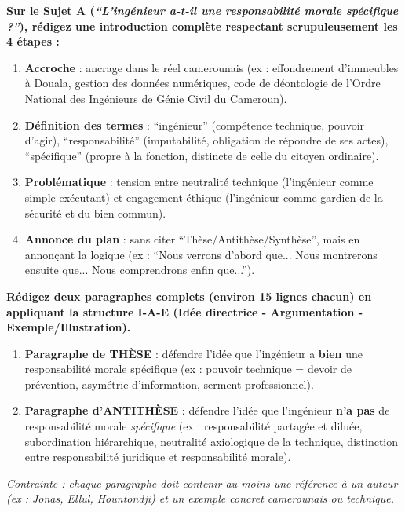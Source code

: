 \documentclass[11pt]{article}
\begin{document}
\begin{exercice}
\textbf{Sur le Sujet A (\emph{``L'ingénieur a-t-il une responsabilité morale spécifique ?''}), rédigez une introduction complète respectant scrupuleusement les 4 étapes :}
\begin{enumerate}
    \item \textbf{Accroche} : ancrage dans le réel camerounais (ex : effondrement d'immeubles à Douala, gestion des données numériques, code de déontologie de l'Ordre National des Ingénieurs de Génie Civil du Cameroun).
    \item \textbf{Définition des termes} : ``ingénieur'' (compétence technique, pouvoir d'agir), ``responsabilité'' (imputabilité, obligation de répondre de ses actes), ``spécifique'' (propre à la fonction, distincte de celle du citoyen ordinaire).
    \item \textbf{Problématique} : tension entre neutralité technique (l'ingénieur comme simple exécutant) et engagement éthique (l'ingénieur comme gardien de la sécurité et du bien commun).
    \item \textbf{Annonce du plan} : sans citer ``Thèse/Antithèse/Synthèse'', mais en annonçant la logique (ex : ``Nous verrons d'abord que... Nous montrerons ensuite que... Nous comprendrons enfin que...'').
\end{enumerate}
\end{exercice}

\begin{exercice}
\textbf{Rédigez deux paragraphes complets (environ 15 lignes chacun) en appliquant la structure I-A-E (Idée directrice - Argumentation - Exemple/Illustration).}
\begin{enumerate}
    \item \textbf{Paragraphe de THÈSE} : défendre l'idée que l'ingénieur a \textbf{bien} une responsabilité morale spécifique (ex : pouvoir technique = devoir de prévention, asymétrie d'information, serment professionnel).
    \item \textbf{Paragraphe d'ANTITHÈSE} : défendre l'idée que l'ingénieur \textbf{n'a pas} de responsabilité morale \emph{spécifique} (ex : responsabilité partagée et diluée, subordination hiérarchique, neutralité axiologique de la technique, distinction entre responsabilité juridique et responsabilité morale).
\end{enumerate}
\textit{Contrainte : chaque paragraphe doit contenir au moins une référence à un auteur (ex : Jonas, Ellul, Hountondji) et un exemple concret camerounais ou technique.}
\end{exercice}
\end{document}
